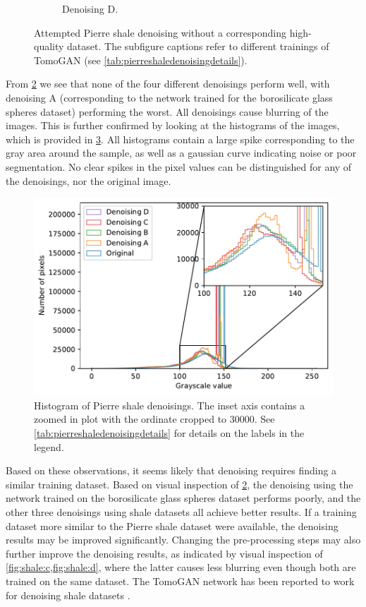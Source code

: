\begin{figure}
\begin{subfigure}[t]{.45\textwidth}
    \caption{Denoising D. }
    \label{fig:shale:d}
  \end{subfigure}
  \caption[Attempted Pierre shale denoising without a corresponding high-quality dataset]{Attempted Pierre shale denoising without a corresponding high-quality dataset. The subfigure captions refer to different trainings of TomoGAN (see \cref{tab:pierreshaledenoisingdetails}). }
  \label{fig:shale}
\end{figure}

From \cref{fig:shale} we see that none of the four different denoisings perform well, with denoising A (corresponding to the network trained for the borosilicate glass spheres dataset) performing the worst. All denoisings cause blurring of the images. This is further confirmed by looking at the histograms of the images, which is provided in \cref{fig:shalehistogram}. All histograms contain a large spike corresponding to the gray area around the sample, as well as a gaussian curve indicating noise or poor segmentation. No clear spikes in the pixel values can be distinguished for any of the denoisings, nor the original image. 

\begin{figure}[htbp]
  \centering
  \includegraphics[width=.9\textwidth]{figures/shalehistogram.pdf}
  \caption[Histogram of Pierre shale denoisings]{Histogram of Pierre shale denoisings. The inset axis contains a zoomed in plot with the ordinate cropped to $30000$. See \cref{tab:pierreshaledenoisingdetails} for details on the labels in the legend. }
  \label{fig:shalehistogram}
\end{figure}

Based on these observations, it seems likely that denoising requires finding a similar training dataset. Based on visual inspection of \cref{fig:shale}, the denoising using the network trained on the borosilicate glass spheres dataset performs poorly, and the other three denoisings using shale datasets all achieve better results. If a training dataset more similar to the Pierre shale dataset were available, the denoising results may be improved significantly. Changing the pre-processing steps may also further improve the denoising results, as indicated by visual inspection of \cref{fig:shale:c,fig:shale:d}, where the latter causes less blurring even though both are trained on the same dataset. The TomoGAN network has been reported to work for denoising shale datasets \cite{liu2020tomogan}. 